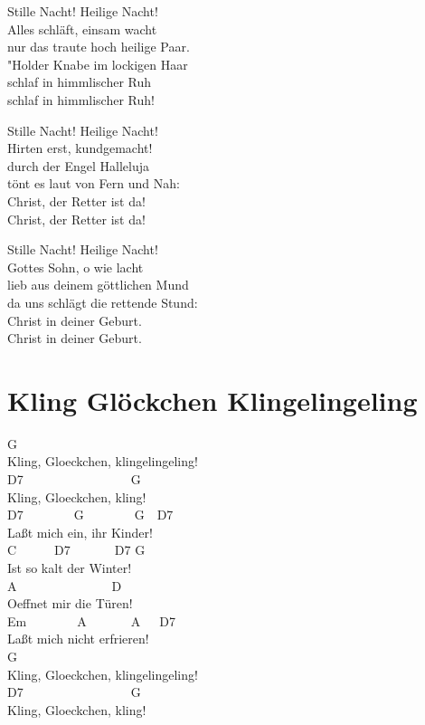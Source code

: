 \documentclass[
  letterpaper,
]{scrbook}
\begin{document}
Stille Nacht! Heilige Nacht!\\
Alles schläft, einsam wacht\\
nur das traute hoch heilige Paar.\\
"Holder Knabe im lockigen Haar\\
schlaf in himmlischer Ruh\textquotesingle{}\\
schlaf in himmlischer Ruh\textquotesingle!

Stille Nacht! Heilige Nacht!\\
Hirten erst, kundgemacht!\\
durch der Engel Halleluja\\
tönt es laut von Fern\textquotesingle{} und Nah:\\
Christ, der Retter ist da!\\
Christ, der Retter ist da!

Stille Nacht! Heilige Nacht!\\
Gottes Sohn, o wie lacht\\
lieb\textquotesingle{} aus deinem göttlichen Mund\\
da uns schlägt die rettende Stund\textquotesingle:\\
Christ in deiner Geburt.\\
Christ in deiner Geburt.

\hypertarget{kling-gluxf6ckchen-klingelingeling}{%
\chapter{Kling Glöckchen
Klingelingeling}\label{kling-gluxf6ckchen-klingelingeling}}

G\\
Kling, Gloeckchen, klingelingeling!\\
D7~~~~~~~~~~~~~~~~~G\\
Kling, Gloeckchen, kling!\\
D7~~~~~~~~G~~~~~~~~G~~D7\\
Laßt mich ein, ihr Kinder!\\
C~~~~~~D7~~~~~~~D7 G\\
Ist so kalt der Winter!\\
A~~~~~~~~~~~~~~~D\\
Oeffnet mir die Türen!\\
Em~~~~~~~~A~~~~~~~A~~~D7\\
Laßt mich nicht erfrieren!\\
G\\
Kling, Gloeckchen, klingelingeling!\\
D7~~~~~~~~~~~~~~~~~G\\
Kling, Gloeckchen, kling!~~
\end{document}
